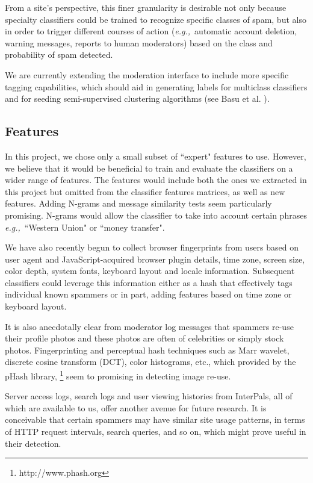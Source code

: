 \documentclass[preprint]{acm_proc_article-sp}
\newcommand{\eg}{{\em e.g.,}~}
\begin{document}
From a site's perspective, this finer granularity is desirable not only 
because specialty classifiers could be trained to recognize specific classes of spam, but also in order to 
trigger different courses of action (\eg automatic account deletion, warning messages, reports to human moderators) 
based on the class and probability of spam detected.

We are currently extending the moderation interface to include more specific tagging capabilities, which should aid 
in generating labels for multiclass classifiers and for seeding semi-supervised clustering algorithms (see Basu et al. 
\cite{basu}).

\subsection{Features}

In this project, we chose only a small subset of ``expert" features to use. However, we believe that 
it would be beneficial to train and evaluate the classifiers on a wider range of features. The features 
would include both the ones we extracted in this project but omitted from the classifier features matrices, 
as well as new features. Adding N-grams and message similarity tests seem particularly promising. 
N-grams would allow the classifier to take into account certain phrases \eg{``Western Union" or ``money transfer"}. 

We have also recently begun to collect browser fingerprints from users based on user agent 
and JavaScript-acquired browser plugin details, time zone, screen size, color depth, system fonts, 
keyboard layout and locale information. Subsequent classifiers could leverage this information either 
as a hash that effectively tags individual known spammers or in part, adding features based on 
time zone or keyboard layout.

It is also anecdotally clear from moderator log messages that spammers re-use their profile photos and 
these photos are often of celebrities or simply stock photos. Fingerprinting and perceptual hash techniques 
such as Marr wavelet, discrete cosine transform (DCT), color histograms, etc., which provided by the 
pHash library, \footnote{http://www.phash.org} seem to promising in detecting image re-use. 


Server access logs, search logs and user viewing histories from InterPals, all of which 
are available to us, offer another avenue for future research. It is conceivable that certain 
spammers may have similar site usage patterns, in terms of HTTP request intervals, search queries, 
and so on, which might prove useful in their detection.
\end{document}
